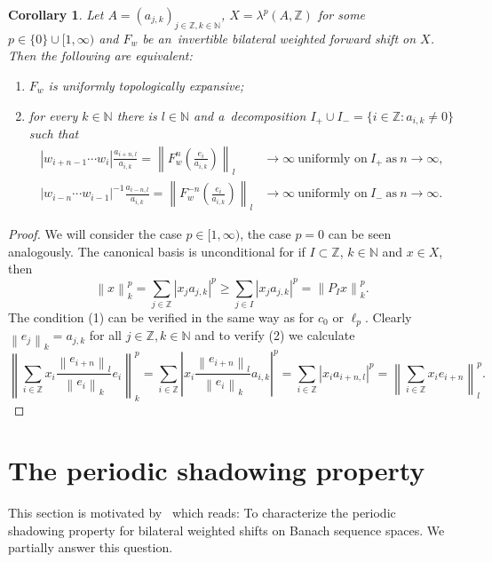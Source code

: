 \documentclass[11pt,a4paper]{amsart}
\newtheorem{corollary}[theorem]{Corollary}
\theoremstyle{definition}
\newcommand{\Z}{\mathbb{Z}}
\newcommand{\N}{\mathbb{N}}
\newcommand{\abs}[1]{\left| #1 \right|}
\newcommand{\norm}[1]{\left\| #1 \right\|}
\begin{document}
	\begin{corollary}
		Let $A = (a_{j,k})_{j \in \Z,k \in \mathbb{N}}$, $X = \lambda^p(A, \Z)$ for some $p \in \{0\}\cup[1,\infty)$ and $F_w$ be an~invertible bilateral weighted forward shift on $X$. Then the following are equivalent:
		\begin{enumerate}
			\item \(F_w\) is uniformly topologically expansive;
			\item for every $k \in \N$ there is $l \in \N$ and a~decomposition $I_{+} \cup I_{-} = \{i \in \Z \colon a_{i, k} \neq 0\}$ such that
			\begin{align*}
				\abs{w_{i+n-1} \cdots w_{i}}\frac{a_{i+n,l}}{a_{i,k}} = \norm{F_w^n\left(\frac{e_i}{a_{i,k}}\right)}_l &\to \infty \ \text{uniformly on} \ I_+ \ \text{as} \ n \to \infty, \\
				\abs{w_{i-n} \cdots w_{i-1}}^{-1}\frac{a_{i-n, l}}{a_{i,k}} = \norm{F_w^{-n}\left(\frac{e_i}{a_{i,k}}\right)}_l &\to \infty \ \text{uniformly on} \ I_- \ \text{as} \ n \to \infty.
			\end{align*}
		\end{enumerate}
	\end{corollary}
	\begin{proof}
		We will consider the case $p \in [1,\infty)$, the case $p=0$ can be seen analogously. The canonical basis is unconditional for if $I \subset \Z$, $k \in \N$ and $x \in X$, then
		\begin{equation*}
			\norm{x}_k^p
			= \sum_{j\in\Z} \abs{x_j a_{j,k}}^p
			\geq \sum_{j\in I} \abs{x_j a_{j,k}}^p
			= \norm{P_Ix}_k^p.
		\end{equation*}
		The condition (1) can be verified in the same way as for $c_0$ or $\ell_p$. Clearly $\norm{e_j}_k = a_{j, k}$ for all $j \in \Z, k\in\N$ and to verify (2) we calculate
		\begin{equation*}
			\norm{\sum_{i\in\Z} x_i \frac{\norm{e_{i+n}}_l}{\norm{e_i}_k} e_i}_k^p
			= \sum_{i\in\Z} \abs{x_i \frac{\norm{e_{i+n}}_l}{\norm{e_i}_k} a_{i,k}}^p
			= \sum_{i\in\Z} \abs{x_i a_{i+n,l}}^p
			= \norm{\sum_{i \in \Z} x_i e_{i+n}}_l^p.
		\end{equation*}
	\end{proof}
	
	
	\section{The periodic shadowing property} \label{sect:PSP}
	
	This section is motivated by~\cite[Problem C]{Shadowing_and_chain_rec} which reads: To characterize the periodic shadowing property for bilateral weighted shifts on Banach sequence spaces. We partially answer this question.
	
\end{document}
